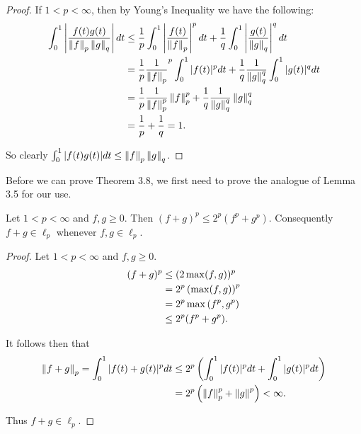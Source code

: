 \documentclass{exam}
\begin{document}
\begin{questions}
\begin{proof}
        If $1 < p < \infty$, then by Young's Inequality we have the following:
        \begin{align*}
            \int_0^1 \left| \frac{f(t)g(t)}{\left\| f \right\|_p\left\| g \right\|_q} \right|dt &\leq \frac{1}{p} \int_0^1 \left| \frac{f(t)}{\left\| f \right\|_p} \right|^p dt
            + \frac{1}{q} \int_0^1 \left| \frac{g(t)}{\left\| g \right\|_q} \right|^q dt\\
            &= \frac{1}{p}\frac{1}{\left\| f \right\|_p}^p \int_0^1 |f(t)|^p dt + 
            \frac{1}{q}\frac{1}{\left\| g \right\|_q^q}\int_0^1 |g(t)|^q dt \\
            &= \frac{1}{p} \frac{1}{\left\| f \right\|_p^p}\left\| f \right\|_p^p + \frac{1}{q}\frac{1}{\left\| g \right\|_q^q}\left\| g \right\|_q^q \\
            &= \frac{1}{p} + \frac{1}{q} = 1.
        \end{align*}

        So clearly $\int_0^1 |f(t)g(t)|dt \leq \left\| f \right\|_p\left\| g \right\|_q$.
    \end{proof}



    Before we can prove Theorem 3.8, we first need to prove the analogue of Lemma 3.5 for our use.
    \setcounter{lemma}{4}
    \begin{lemma}\label{thm:main}
        Let $1 < p < \infty$ and $f, g \geq 0$. Then $(f + g)^p \leq 2^p(f^p + g^p)$. Consequently $f + g \in\ell_p$ 
        whenever $f,g\in\ell_p$.
    \end{lemma}
    \begin{proof}
        Let $1 < p < \infty$ and $f, g \geq 0$.
        \begin{align*}
            (f + g)^p &\leq (2\max(f, g))^p \\
            &= 2^p\left( \max (f, g) \right)^p \\
            &= 2^p \max\left( f^p, g^p \right) \\
            &\leq 2^p(f^p + g^p).
        \end{align*}

        It follows then that
        \begin{align*}
            \left\| f + g \right\|_p = \int_0^1 |f(t) + g(t)|^p dt &\leq 2^p\left( \int_0^1 |f(t)|^pdt + \int_0^1 |g(t)|^p dt \right) \\
            &= 2^p\left( \left\| f \right\|_p^p + \left\| g \right\|^p \right) < \infty.
        \end{align*}

        Thus $f + g\in\ell_p$.
    \end{proof}
    \newpage




\end{questions}
\end{document}
